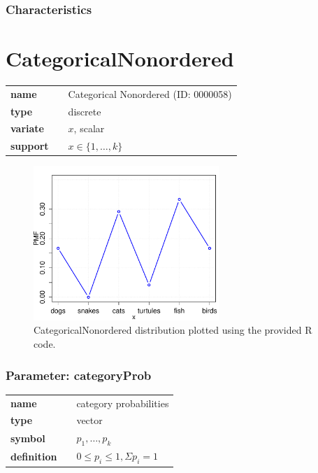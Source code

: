 \subsubsection*{Characteristics}
\smallskip
\section*{CategoricalNonordered} 

  \bigskip 

\begin{tabular}{p{2cm}cl}
\textbf{name} & & Categorical Nonordered (ID: 0000058)\\ 
 
\textbf{type} & & discrete \\ 

\textbf{variate} & & $x$, scalar \\ 

\textbf{support} & & $x \in \{1,\dots,k\}$
\end{tabular}

\begin{figure}[ht!]
\centering
  \includegraphics[width=70mm]{pics/CategoricalNonordered.pdf}
 \caption{CategoricalNonordered distribution plotted using the provided R code.}
 \label{fig:CategoricalNonordered}
\end{figure}

\subsubsection*{Parameter: categoryProb}

\noindent\begin{tabular}{p{2cm}cl}
\textbf{name} & & category probabilities \\
\textbf{type} & & vector \\
\textbf{symbol} & & $p_1, \ldots, p_k$  \\
\textbf{definition} & & $0 \leq p_i \leq 1, \Sigma p_i = 1$
\end{tabular}
